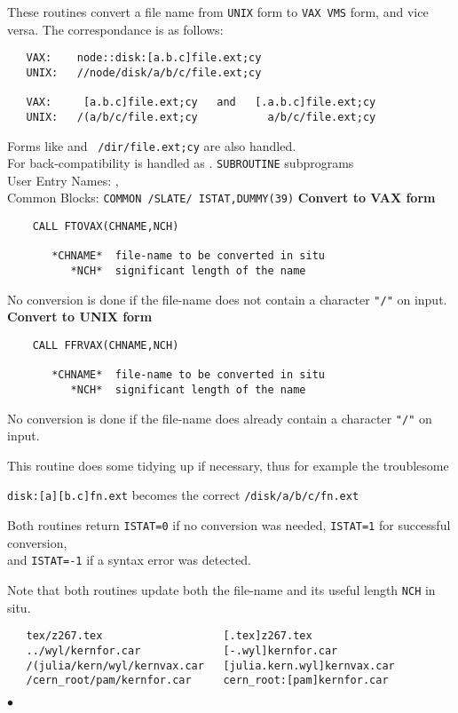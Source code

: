                           
                     
\Submitter{}                                 
                       
These routines convert a file name from {\tt UNIX} form
to {\tt VAX VMS} form, and vice versa.
The correspondance is as follows:
\begin{verbatim}
   VAX:    node::disk:[a.b.c]file.ext;cy
   UNIX:   //node/disk/a/b/c/file.ext;cy
 
   VAX:     [a.b.c]file.ext;cy   and   [.a.b.c]file.ext;cy
   UNIX:   /(a/b/c/file.ext;cy           a/b/c/file.ext;cy
\end{verbatim}
Forms like   \qquad and \qquad
{\tt ~/dir/file.ext;cy} \qquad are also handled. \\
For back-compatibility   \qquad
is handled as  .
\Structure
{\tt SUBROUTINE} subprograms \\
User Entry Names: ,  \\
Common Blocks: {\tt COMMON /SLATE/ ISTAT,DUMMY(39)}
\Usage
{\bf Convert to VAX form}
\begin{verbatim}
    CALL FTOVAX(CHNAME,NCH)
 
       *CHNAME*  file-name to be converted in situ
          *NCH*  significant length of the name
\end{verbatim}
 
No conversion is done if the file-name does not contain
a character {\tt "/"} on input. \\[3mm]
{\bf Convert to UNIX form}
\begin{verbatim}
    CALL FFRVAX(CHNAME,NCH)
 
       *CHNAME*  file-name to be converted in situ
          *NCH*  significant length of the name
\end{verbatim}
No conversion is done if the file-name does already contain
a character {\tt "/"} on input.
\par
This routine does some tidying up if necessary, thus for example
the troublesome
\begin{center}
{\tt disk:[a][b.c]fn.ext} \qquad becomes the correct \qquad
{\tt /disk/a/b/c/fn.ext}
\end{center}
\par
Both routines return {\tt ISTAT=0} if no conversion was needed,
{\tt ISTAT=1} for successful conversion, \\
and {\tt ISTAT=-1} if a syntax error was detected.
 
Note that both routines update both the file-name and its useful
length {\tt NCH} in situ.
\Examples
\begin{verbatim}
   tex/z267.tex                   [.tex]z267.tex
   ../wyl/kernfor.car             [-.wyl]kernfor.car
   /(julia/kern/wyl/kernvax.car   [julia.kern.wyl]kernvax.car
   /cern_root/pam/kernfor.car     cern_root:[pam]kernfor.car
\end{verbatim}
$\bullet$
